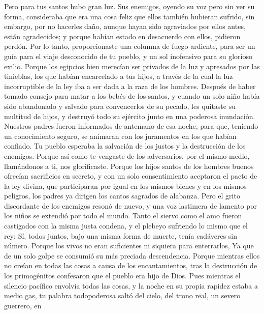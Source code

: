  Pero para tus santos hubo gran luz. Sus enemigos, oyendo
su voz pero sin ver su forma, consideraba que era una cosa feliz que
ellos también hubieran sufrido,  sin embargo, por no
hacerles daño, aunque hayan sido agraviados por ellos antes, están
agradecidos; y porque habían estado en desacuerdo con ellos, pidieron
perdón.  Por lo tanto, proporcionaste una columna de fuego
ardiente, para ser un guía para el viaje desconocido de tu pueblo, y un
sol inofensivo para su glorioso exilio.  Porque los
egipcios bien merecían ser privados de la luz y apresados por las
tinieblas, los que habían encarcelado a tus hijos, a través de la cual
la luz incorruptible de la ley iba a ser dada a la raza de los hombres.
 Después de haber tomado consejo para matar a los bebés de
los santos, y cuando un solo niño había sido abandonado y salvado para
convencerlos de su pecado, les quitaste su multitud de hijos, y destruyó
todo su ejército junto en una poderosa inundación. 
Nuestros padres fueron informados de antemano de esa noche, para que,
teniendo un conocimiento seguro, se animaran con los juramentos en los
que habían confiado.  Tu pueblo esperaba la salvación de
los justos y la destrucción de los enemigos.  Porque así
como te vengaste de los adversarios, por el mismo medio, llamándonos a
ti, nos glorificaste.  Porque los hijos santos de los
hombres buenos ofrecían sacrificios en secreto, y con un solo
consentimiento aceptaron el pacto de la ley divina, que participaran por
igual en los mismos bienes y en los mismos peligros, los padres ya
dirigen los cantos sagrados de alabanza.  Pero el grito
discordante de los enemigos resonó de nuevo, y una voz lastimera de
lamento por los niños se extendió por todo el mundo. 
Tanto el siervo como el amo fueron castigados con la misma justa
condena, y el plebeyo sufriendo lo mismo que el rey;  Sí,
todos juntos, bajo una misma forma de muerte, tenía cadáveres sin
número. Porque los vivos no eran suficientes ni siquiera para
enterrarlos, Ya que de un solo golpe se consumió su más preciada
descendencia.  Porque mientras ellos no creían en todas
las cosas a causa de los encantamientos, tras la destrucción de los
primogénitos confesaron que el pueblo era hijo de Dios. 
Pues mientras el silencio pacífico envolvía todas las cosas, y la noche
en su propia rapidez estaba a medio gas,  tu palabra
todopoderosa saltó del cielo, del trono real, un severo guerrero, en
